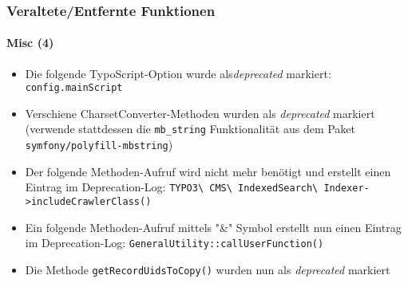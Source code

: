 \begin{frame}[fragile]
	\frametitle{Veraltete/Entfernte Funktionen}
	\framesubtitle{Misc (4)}


	\begin{itemize}

		\item Die folgende TypoScript-Option wurde als\textit{deprecated} markiert:\newline
			\texttt{config.mainScript}

		\item Verschiene CharsetConverter-Methoden wurden als \textit{deprecated} markiert\newline
			\small
				(verwende stattdessen die \texttt{mb\_string} Funktionalität aus dem Paket \texttt{symfony/polyfill-mbstring})
			\normalsize

		\item Der folgende Methoden-Aufruf wird nicht mehr benötigt und erstellt einen Eintrag im Deprecation-Log:
			\small\texttt{TYPO3\textbackslash
				CMS\textbackslash
				IndexedSearch\textbackslash
				Indexer->includeCrawlerClass()}
			\normalsize

		\item Ein folgende Methoden-Aufruf mittels "\&" Symbol erstellt nun einen Eintrag im Deprecation-Log:
			\small\texttt{GeneralUtility::callUserFunction()}\normalsize

		\item Die Methode \texttt{getRecordUidsToCopy()} wurden nun als \textit{deprecated} markiert

	\end{itemize}

\end{frame}









